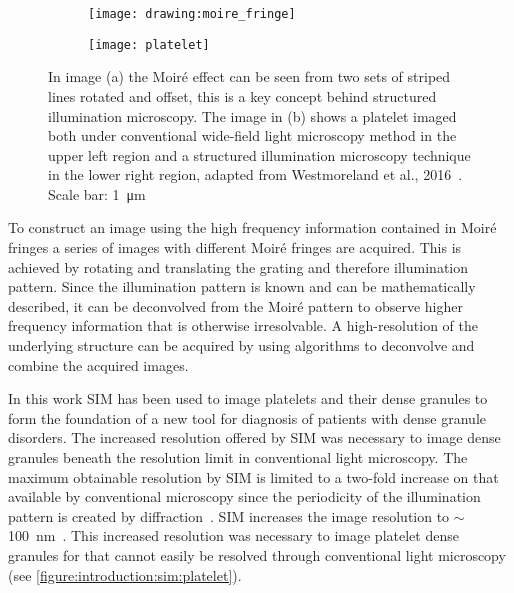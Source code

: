 \begin{figure}[htbp!]\centering
\hspace*{\fill}
	\begin{subfigure}[b]{0.33\linewidth}
		\centering
		\texttt{[image: drawing:moire\_fringe]}
		\caption{}
		\label{figure:introduction:sim:moire}
	\end{subfigure}
	\hfill
	\begin{subfigure}[b]{0.33\linewidth}
		\centering
		\texttt{[image: platelet]}
		\caption{}
		\label{figure:introduction:sim:platelet}
	\end{subfigure}
\hspace*{\fill}
\caption[Structured illumination microscopy]{In image (a) the Moir\'e effect can be seen from two sets of striped lines rotated and offset, this is a key concept behind structured illumination microscopy. The image in (b) shows a platelet imaged both under conventional wide-field light microscopy method in the upper left region and a structured illumination microscopy technique in the lower right region, adapted from Westmoreland et al., 2016~\cite{Westmoreland2016}. Scale bar: \SI{1}{\micro\meter}}
\label{figure:sim}
\end{figure}

To construct an image using the high frequency information contained in Moir\'e fringes a series of images with different Moir\'e fringes are acquired. This is achieved by rotating and translating the grating and therefore illumination pattern. Since the illumination pattern is known and can be mathematically described, it can be deconvolved from the Moir\'e pattern to observe higher frequency information that is otherwise irresolvable. A high-resolution of the underlying structure can be acquired by using algorithms to deconvolve and combine the acquired images.

In this work SIM has been used to image platelets and their dense granules to form the foundation of a new tool for diagnosis of patients with dense granule disorders. The increased resolution offered by SIM was necessary to image dense granules beneath the resolution limit in conventional light microscopy. The maximum obtainable resolution by SIM is limited to a two-fold increase on that available by conventional microscopy since the periodicity of the illumination pattern is created by diffraction~\cite{Gustafsson2000}. SIM increases the image resolution to $\sim$\SI{100}{\nano\meter}~\cite{Huang2010}. This increased resolution was necessary to image platelet dense granules for that cannot easily be resolved through conventional light microscopy (see \autoref{figure:introduction:sim:platelet}).

